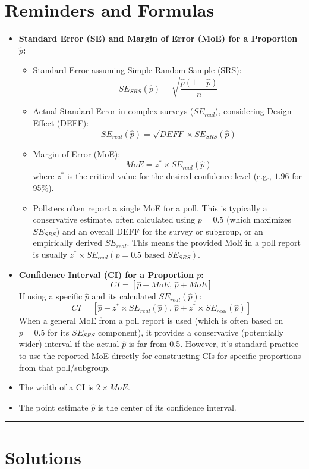 \documentclass[12pt]{article}
\begin{document}
\section*{Reminders and Formulas}
\begin{itemize}
    \item \textbf{Standard Error (SE) and Margin of Error (MoE) for a Proportion $\hat{p}$:}
    \begin{itemize}
        \item Standard Error assuming Simple Random Sample (SRS):
        \[ SE_{SRS}(\hat{p}) = \sqrt{\frac{\hat{p}(1-\hat{p})}{n}} \]
        \item Actual Standard Error in complex surveys ($SE_{real}$), considering Design Effect (DEFF):
        \[ SE_{real}(\hat{p}) = \sqrt{DEFF} \times SE_{SRS}(\hat{p}) \]
        \item Margin of Error (MoE):
        \[ MoE = z^* \times SE_{real}(\hat{p}) \]
        where $z^*$ is the critical value for the desired confidence level (e.g., $1.96$ for 95\%).
        \item Pollsters often report a single MoE for a poll. This is typically a conservative estimate, often calculated using $p=0.5$ (which maximizes $SE_{SRS}$) and an overall DEFF for the survey or subgroup, or an empirically derived $SE_{real}$. This means the provided MoE in a poll report is usually $z^* \times SE_{real}(p=0.5 \text{ based } SE_{SRS})$.
    \end{itemize}
    \item \textbf{Confidence Interval (CI) for a Proportion $p$:}
    \[ CI = \left[ \hat{p} - MoE, \, \hat{p} + MoE \right] \]
    If using a specific $\hat{p}$ and its calculated $SE_{real}(\hat{p})$:
    \[ CI = \left[ \hat{p} - z^* \times SE_{real}(\hat{p}), \, \hat{p} + z^* \times SE_{real}(\hat{p}) \right] \]
    When a general MoE from a poll report is used (which is often based on $p=0.5$ for its $SE_{SRS}$ component), it provides a conservative (potentially wider) interval if the actual $\hat{p}$ is far from 0.5. However, it's standard practice to use the reported MoE directly for constructing CIs for specific proportions from that poll/subgroup.
    \item The width of a CI is $2 \times MoE$.
    \item The point estimate $\hat{p}$ is the center of its confidence interval.
\end{itemize}

\hrule
\newpage
\section*{Solutions}
\end{document}
